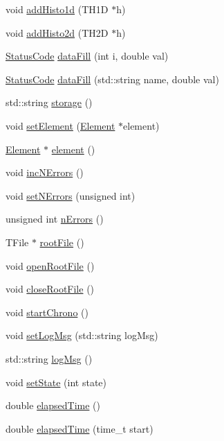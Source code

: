 \begin{DoxyCompactItemize}
void \hyperlink{classProcessus_ad46e0d4dfdfdcbce001ee6be1746dfa4}{addHisto1d} (TH1D $\ast$h)
\item 
void \hyperlink{classProcessus_ac1ed1aed5edaeabdf18aa56775440471}{addHisto2d} (TH2D $\ast$h)
\item 
\hyperlink{classStatusCode}{StatusCode} \hyperlink{classProcessus_a0d093b48f3218a088ba030e24372f18c}{dataFill} (int i, double val)
\item 
\hyperlink{classStatusCode}{StatusCode} \hyperlink{classProcessus_aa31ab71711f7af6a729441ff573f69c9}{dataFill} (std::string name, double val)
\item 
std::string \hyperlink{classProcessus_a33fa1a0b54a636e5cdd680669fd9ea51}{storage} ()
\item 
void \hyperlink{classProcessus_a8ddef94227d83d9dae2cd49aebc33353}{setElement} (\hyperlink{classElement}{Element} $\ast$element)
\item 
\hyperlink{classElement}{Element} $\ast$ \hyperlink{classProcessus_a6fe155527431a7190b7d44d600b9608d}{element} ()
\item 
void \hyperlink{classProcessus_abe603d0636f76db6aa6c5c60cf34c591}{incNErrors} ()
\item 
void \hyperlink{classProcessus_a831b027b9cf18ab56fa6147b5d3055da}{setNErrors} (unsigned int)
\item 
unsigned int \hyperlink{classProcessus_a82a0487f82f07cc2c2dc2731f98149e7}{nErrors} ()
\item 
TFile $\ast$ \hyperlink{classProcessus_a247e8c362ec08422cf53d08dd23b093c}{rootFile} ()
\item 
void \hyperlink{classProcessus_aacf6812880c1d1a2bf14a4a39458f443}{openRootFile} ()
\item 
void \hyperlink{classProcessus_a2f3c41e99da4c738ea3d8f7b0d20a665}{closeRootFile} ()
\item 
void \hyperlink{classProcessus_a5e4d34b86241fa0756e07375a14ff4b2}{startChrono} ()
\item 
void \hyperlink{classProcessus_a471833f89047aa9a7ff6200a31c17a1d}{setLogMsg} (std::string logMsg)
\item 
std::string \hyperlink{classProcessus_a42fdeb17dc13ba854222666b6aa29b61}{logMsg} ()
\item 
void \hyperlink{classProcessus_ad38cde0f1bcefa00b068e7947b8af927}{setState} (int state)
\item 
double \hyperlink{classProcessus_aecca96218c65bc805c988cd95447df55}{elapsedTime} ()
\item 
double \hyperlink{classProcessus_a06d3815ad56593dfd0d3c1f534f8b146}{elapsedTime} (time\_\-t start)

\end{DoxyCompactItemize}
